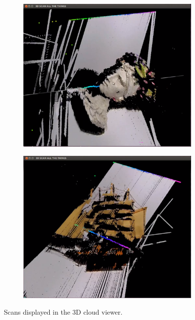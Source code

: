 \documentclass[10pt]{article}
\begin{document}
\begin{figure}[h!]
\begin{subfigure}[b]{0.32\linewidth}
    \end{subfigure}
    \begin{subfigure}[b]{0.32\linewidth}
           \centering
            \includegraphics[width=\linewidth]{chiquita/chiquita}
            \caption{}
           
    \end{subfigure}
    \begin{subfigure}[b]{0.32\linewidth}
           \centering
            \includegraphics[width=\linewidth]{schooner/schooner}
            \caption{}
           
    \end{subfigure}


        \caption{Scans displayed in the 3D cloud viewer.}\label{}
\end{figure}
\end{document}
